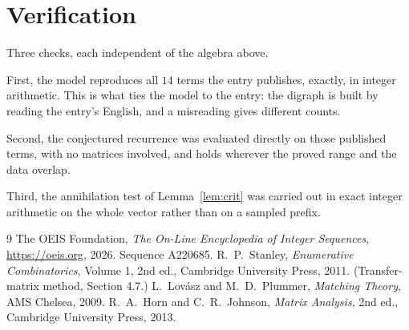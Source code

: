 \documentclass[11pt,a4paper]{article}
\theoremstyle{plain}
\theoremstyle{definition}
\begin{document}
\section{Verification}

Three checks, each independent of the algebra above.

First, the model reproduces all $14$ terms the entry publishes, exactly, in integer
arithmetic. This is what ties the model to the entry: the digraph is built by reading the
entry's English, and a misreading gives different counts.

Second, the conjectured recurrence was evaluated directly on those published terms, with no
matrices involved, and holds wherever the proved range and the data overlap.

Third, the annihilation test of Lemma~\ref{lem:crit} was carried out in exact integer
arithmetic on the whole vector rather than on a sampled prefix.

\begin{thebibliography}{9}
 The OEIS Foundation, \emph{The On-Line Encyclopedia of Integer
Sequences}, \url{https://oeis.org}, 2026. Sequence A220685.
 R.~P.~Stanley, \emph{Enumerative Combinatorics}, Volume 1, 2nd ed.,
Cambridge University Press, 2011. (Transfer-matrix method, Section 4.7.)
 L.~Lov\'asz and M.~D.~Plummer, \emph{Matching Theory}, AMS Chelsea,
2009.
 R.~A.~Horn and C.~R.~Johnson, \emph{Matrix Analysis}, 2nd ed., Cambridge
University Press, 2013.
\end{thebibliography}
\end{document}
